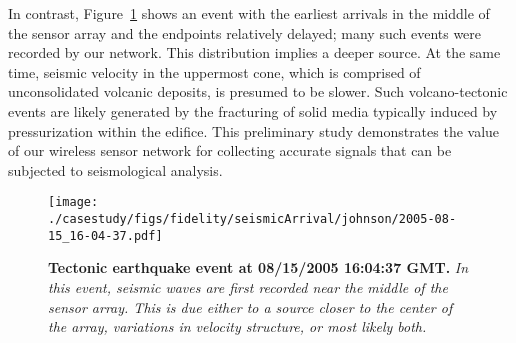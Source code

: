 In contrast, Figure~\ref{fig-jjTectonic} shows an event with the earliest
arrivals in the middle of the sensor array and the endpoints relatively
delayed; many such events were recorded by our network. 
This distribution implies a deeper source.  At the same time,
seismic velocity in the uppermost cone, which is comprised of unconsolidated
volcanic deposits, is presumed to be slower.  Such volcano-tectonic events
are likely generated by the fracturing of solid media typically induced
by pressurization within the edifice. This preliminary study
demonstrates the value of our wireless sensor network for collecting
accurate signals that can be subjected to seismological analysis.

\begin{figure}[t]
\begin{center}
\texttt{[image: ./casestudy/figs/fidelity/seismicArrival/johnson/2005-08-15\_16-04-37.pdf]}
\end{center}
\caption{\small{\bf Tectonic earthquake event at 08/15/2005 16:04:37
GMT.} {\em In this event, seismic waves are first recorded near the
middle of the sensor array. This is due either to a source closer 
to the center of the array, variations in velocity structure, 
or most likely both.}}
\label{fig-jjTectonic}
\end{figure}





